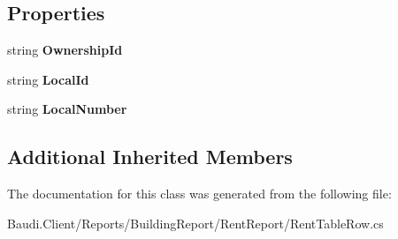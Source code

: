 \subsection*{Properties}
\begin{DoxyCompactItemize}
\item 
\hypertarget{class_baudi_1_1_client_1_1_reports_1_1_building_report_1_1_rent_report_1_1_rent_table_row_a450127a92e3161ecc8ddf5d95a245b2e}{}string {\bfseries Ownership\+Id}\label{class_baudi_1_1_client_1_1_reports_1_1_building_report_1_1_rent_report_1_1_rent_table_row_a450127a92e3161ecc8ddf5d95a245b2e}

\item 
\hypertarget{class_baudi_1_1_client_1_1_reports_1_1_building_report_1_1_rent_report_1_1_rent_table_row_a5f41b93e5c7ff2b7c20769ebcd4aebc4}{}string {\bfseries Local\+Id}\label{class_baudi_1_1_client_1_1_reports_1_1_building_report_1_1_rent_report_1_1_rent_table_row_a5f41b93e5c7ff2b7c20769ebcd4aebc4}

\item 
\hypertarget{class_baudi_1_1_client_1_1_reports_1_1_building_report_1_1_rent_report_1_1_rent_table_row_a7d1d250e344a88ae73e3c479c4045c54}{}string {\bfseries Local\+Number}\label{class_baudi_1_1_client_1_1_reports_1_1_building_report_1_1_rent_report_1_1_rent_table_row_a7d1d250e344a88ae73e3c479c4045c54}

\end{DoxyCompactItemize}
\subsection*{Additional Inherited Members}


The documentation for this class was generated from the following file\+:\begin{DoxyCompactItemize}
\item 
Baudi.\+Client/\+Reports/\+Building\+Report/\+Rent\+Report/Rent\+Table\+Row.\+cs\end{DoxyCompactItemize}
